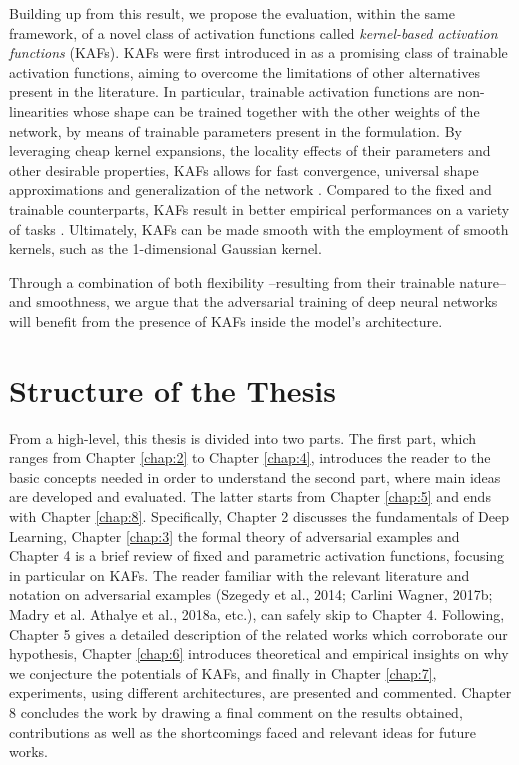 \documentclass[LaM,binding=0.6cm]{./packages/sapthesis/sapthesis}
\begin{document}
        Building up from this result, we propose the evaluation, within the same framework, of a novel class of activation functions called \textit{kernel-based activation functions} (KAFs).
        KAFs were first introduced in \cite{kafnets} as a promising class of trainable activation functions, aiming to overcome the limitations of other alternatives present in the literature. 
        In particular, trainable activation functions are non-linearities whose shape can be trained together with the other weights of the network, by means of 
        trainable parameters present in the formulation. By leveraging cheap kernel expansions, the locality effects of their parameters and other desirable 
        properties, KAFs allows for fast convergence, universal shape approximations and generalization of the network \cite{kafnets_generalization}.
        Compared to the fixed and trainable counterparts, KAFs result in better empirical performances on a variety of tasks \cite{kafnets}. Ultimately,
        KAFs can be made smooth with the employment of smooth kernels, such as the 1-dimensional Gaussian kernel.

        Through a combination of both flexibility --resulting from their trainable nature-- and smoothness, we argue that the adversarial training of
        deep neural networks will benefit from the presence of KAFs inside the model's architecture.
        
    \section{Structure of the Thesis}

    From a high-level, this thesis is divided into two parts. The first part, which ranges from Chapter \ref{chap:2} to Chapter \ref{chap:4}, introduces the reader 
    to the basic concepts needed in order to understand the second part, where main ideas are developed and evaluated. The latter starts from Chapter \ref{chap:5} and ends with Chapter \ref{chap:8}.
    Specifically, Chapter 2 discusses the fundamentals of Deep Learning, Chapter \ref{chap:3} the formal theory of adversarial examples and Chapter 4 is a brief review of
    fixed and parametric activation functions, focusing in particular on KAFs. The reader familiar with the relevant literature and notation on adversarial 
    examples (Szegedy et al., 2014; Carlini  Wagner, 2017b; Madry et al. Athalye et al., 2018a, etc.), can safely skip to Chapter 4.
    Following, Chapter 5 gives a detailed description of the related works which corroborate our hypothesis, Chapter \ref{chap:6} introduces theoretical 
    and empirical insights on why we conjecture the potentials of KAFs, and finally in Chapter \ref{chap:7}, experiments, using different architectures, 
    are presented and commented. Chapter 8 concludes the work by drawing a final comment on the results obtained, contributions 
    as well as the shortcomings faced and relevant ideas for future works.
\end{document}
